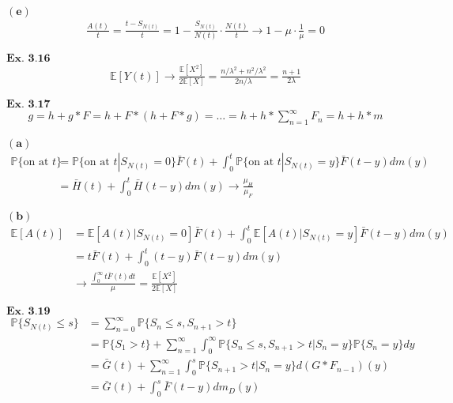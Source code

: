 \documentclass{article}
\begin{document}
$\mathbf{(e)}$
\begin{align*}
\frac{A(t)}{t} = \frac{t-S_{N(t)}}{t} = 1- \frac{S_{N(t)}}{N(t)}\cdot\frac{N(t)}{t} \rightarrow 1-\mu\cdot\frac{1}{\mu} = 0
\end{align*}

\vspace{0.2in}
${\textbf{Ex. 3.16}}$
\begin{align*}
\mathbb{E}[Y(t)] \rightarrow \frac{\mathbb{E}[X^2]}{2\mathbb{E}[X]} = \frac{n/\lambda^2 + n^2/\lambda^2}{2n/\lambda} = \frac{n+1}{2\lambda}
\end{align*}

\vspace{0.2in}
${\textbf{Ex. 3.17}}$
\begin{align*}
g = h + g*F = h + F*(h+F*g) = \ldots = h + h*\sum_{n=1}^{\infty}F_n = h + h*m
\end{align*}

$\mathbf{(a)}$
\begin{align*}
\mathbb{P}\{\text{on at } t\} &= \mathbb{P}\{\text{on at } t|S_{N(t)} = 0\}\bar{F}(t) + \int_{0}^{t}\mathbb{P}\{\text{on at }t|S_{N(t)}=y\}\bar{F}(t-y)dm(y)\\
&= \bar{H}(t) + \int_{0}^{t}\bar{H}(t-y)dm(y) \rightarrow \frac{\mu_{H}}{\mu_{F}}
\end{align*}

$\mathbf{(b)}$
\begin{align*}
\mathbb{E}[A(t)] &= \mathbb{E}[A(t)|S_{N(t)}=0]\bar{F}(t) + \int_{0}^{t}\mathbb{E}[A(t)|S_{N(t)}=y]\bar{F}(t-y)dm(y)\\
&= t\bar{F}(t) + \int_{0}^{t}(t-y)\bar{F}(t-y)dm(y)\\
&\rightarrow \frac{\int_{0}^{\infty}t\bar{F}(t)dt}{\mu} = \frac{\mathbb{E}[X^2]}{2\mathbb{E}[X]}
\end{align*}

\vspace{0.2in}
\begin{comment}
${\textbf{Ex. 3.18}}$

\vspace{0.2in}
\end{comment}
${\textbf{Ex. 3.19}}$
\begin{align*}
\mathbb{P}\{S_{N(t)}\leq s\} &= \sum_{n=0}^{\infty}\mathbb{P}\{S_{n}\leq s, S_{n+1}>t\} \\
&= \mathbb{P}\{S_1 > t\} + \sum_{n=1}^{\infty}\int_{0}^{\infty}\mathbb{P}\{S_{n}\leq s,S_{n+1}>t|S_n=y\}\mathbb{P}\{S_{n}=y\}dy\\
&= \bar{G}(t) + \sum_{n=1}^{\infty}\int_{0}^{s}\mathbb{P}\{S_{n+1}>t|S_{n}=y\}d(G*F_{n-1})(y)\\
&= \bar{G}(t) + \int_{0}^{s}\bar{F}(t-y)dm_{D}(y)
\end{align*}
\end{document}
